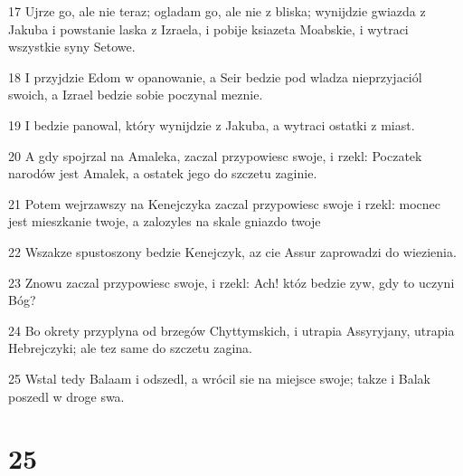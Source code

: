 \par 17 Ujrze go, ale nie teraz; ogladam go, ale nie z bliska; wynijdzie gwiazda z Jakuba i powstanie laska z Izraela, i pobije ksiazeta Moabskie, i wytraci wszystkie syny Setowe.
\par 18 I przyjdzie Edom w opanowanie, a Seir bedzie pod wladza nieprzyjaciól swoich, a Izrael bedzie sobie poczynal meznie.
\par 19 I bedzie panowal, który wynijdzie z Jakuba, a wytraci ostatki z miast.
\par 20 A gdy spojrzal na Amaleka, zaczal przypowiesc swoje, i rzekl: Poczatek narodów jest Amalek, a ostatek jego do szczetu zaginie.
\par 21 Potem wejrzawszy na Kenejczyka zaczal przypowiesc swoje i rzekl: mocnec jest mieszkanie twoje, a zalozyles na skale gniazdo twoje
\par 22 Wszakze spustoszony bedzie Kenejczyk, az cie Assur zaprowadzi do wiezienia.
\par 23 Znowu zaczal przypowiesc swoje, i rzekl: Ach! któz bedzie zyw, gdy to uczyni Bóg?
\par 24 Bo okrety przyplyna od brzegów Chyttymskich, i utrapia Assyryjany, utrapia Hebrejczyki; ale tez same do szczetu zagina.
\par 25 Wstal tedy Balaam i odszedl, a wrócil sie na miejsce swoje; takze i Balak poszedl w droge swa.

\chapter{25}

